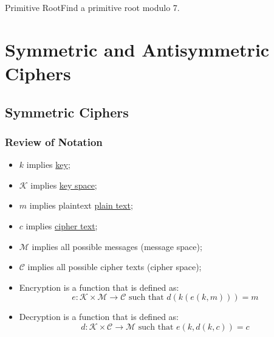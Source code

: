 \begin{example}
    {Primitive Root}Find a primitive root modulo 7.
\end{example}



\section{Symmetric and Antisymmetric Ciphers}

\subsection{Symmetric Ciphers}


\begin{center}
    \subsubsection{Review of Notation}
\end{center}

\begin{itemize}
    \item \(k\) implies \hyperlink{Key}{key};
    \item \(\mathcal{K}\) implies \hyperlink{Key Space}{key space};
    \item \(m\) implies plaintext \hyperlink{Plain Text}{plain text};
    \item \(c\) implies \hyperlink{Cipher Text}{cipher text};
    \item \(\mathcal{M}\) implies all possible messages (message space);
    \item \(\mathcal{C}\) implies all possible cipher texts (cipher space);
    \item Encryption is a function that is defined as: \[e: \mathcal{K} \times \mathcal{M} \rightarrow \mathcal{C} \text{ such that } d(k(e(k,m))) = m\]
    \item Decryption is a function that is defined as: \[d: \mathcal{K} \times \mathcal{C} \rightarrow \mathcal{M} \text{ such that } e(k,d(k,c)) = c\]
\end{itemize}


